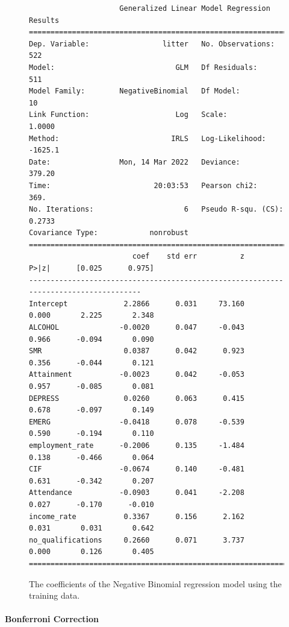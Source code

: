 \documentclass{thesis}
\begin{document}
\begin{figure}[h]
    \centering
\footnotesize
\begin{verbatim}
                     Generalized Linear Model Regression Results                  
==============================================================================
Dep. Variable:                 litter   No. Observations:                  522
Model:                            GLM   Df Residuals:                      511
Model Family:        NegativeBinomial   Df Model:                           10
Link Function:                    Log   Scale:                          1.0000
Method:                          IRLS   Log-Likelihood:                -1625.1
Date:                Mon, 14 Mar 2022   Deviance:                       379.20
Time:                        20:03:53   Pearson chi2:                     369.
No. Iterations:                     6   Pseudo R-squ. (CS):             0.2733
Covariance Type:            nonrobust                                         
=====================================================================================
                        coef    std err          z      P>|z|      [0.025      0.975]
-------------------------------------------------------------------------------------
Intercept             2.2866      0.031     73.160      0.000       2.225       2.348
ALCOHOL              -0.0020      0.047     -0.043      0.966      -0.094       0.090
SMR                   0.0387      0.042      0.923      0.356      -0.044       0.121
Attainment           -0.0023      0.042     -0.053      0.957      -0.085       0.081
DEPRESS               0.0260      0.063      0.415      0.678      -0.097       0.149
EMERG                -0.0418      0.078     -0.539      0.590      -0.194       0.110
employment_rate      -0.2006      0.135     -1.484      0.138      -0.466       0.064
CIF                  -0.0674      0.140     -0.481      0.631      -0.342       0.207
Attendance           -0.0903      0.041     -2.208      0.027      -0.170      -0.010
income_rate           0.3367      0.156      2.162      0.031       0.031       0.642
no_qualifications     0.2660      0.071      3.737      0.000       0.126       0.405
=====================================================================================
\end{verbatim}
\normalsize
    \caption{The coefficients of the Negative Binomial regression model using the training data.}
    \label{fig:nb-coeff}
\end{figure}

\paragraph{Bonferroni Correction}
\end{document}
